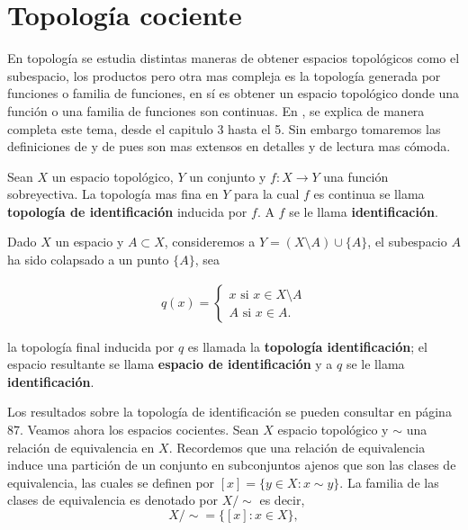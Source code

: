 \section*{Topología cociente}

En topología se estudia distintas maneras de obtener espacios topológicos como el subespacio, los productos pero otra mas compleja es la topología generada por funciones o familia de funciones, en sí es obtener un espacio topológico donde una función o una familia de funciones son continuas. En \cite{top_salicrup}, se explica de manera completa este tema, desde el capitulo 3 hasta el 5. Sin embargo tomaremos las definiciones de \cite{top_prieto} y de \cite{top_juan} pues son mas extensos en detalles y de lectura mas cómoda. 

\begin{df}
Sean $X$ un espacio topológico, $Y$ un conjunto y $f:X \to Y$ una función sobreyectiva. La topología mas fina en $Y$ para la cual $f$ es continua se llama \textbf{topología de identificación} inducida por $f$. A $f$ se le llama \textbf{identificación}.
\end{df}

Dado $X$ un espacio y $A \subset X$, consideremos a $Y=(X\setminus A) \cup \{A\}$, el subespacio $A$ ha sido colapsado a un punto $\{A\}$, sea

\begin{align*}
q(x)= \begin{cases}
x \text{ si } x \in X\setminus A \\
A \text{ si } x \in A.
\end{cases}
\end{align*}

la topología final inducida por $q$ es llamada la \textbf{topología identificación}; el espacio resultante se llama \textbf{espacio de identificación} y a $q$ se le llama \textbf{identificación}. 



Los resultados sobre la topología de identificación se pueden consultar en \cite{top_prieto} página 87. Veamos ahora los espacios cocientes. Sean $X$ espacio topológico y $\sim$ una relación de equivalencia en $X$. Recordemos que una relación de equivalencia induce una partición de un conjunto en subconjuntos ajenos que son las clases de equivalencia, las cuales se definen por $[x]=\{y \in X : x \sim y\}$. La familia de las clases de equivalencia es denotado por $X/ \sim$ es decir, $$X/ \sim=\{[x]: x \in X\},$$  

